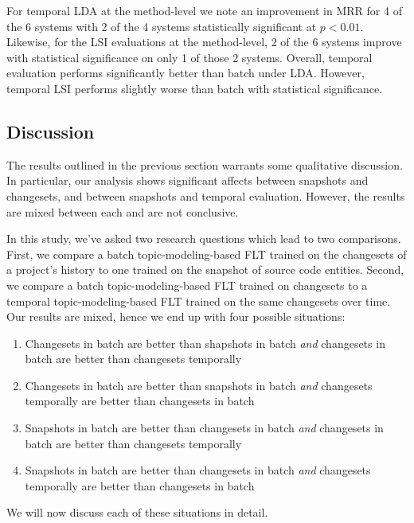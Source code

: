 For temporal LDA at the method-level we note an improvement in MRR for 4 of the 6 systems
with 2 of the 4 systems statistically significant at $p<0.01$.
Likewise, for the LSI evaluations at the method-level, 2 of the 6 systems improve
with statistical significance on only 1 of those 2 systems.
Overall, temporal evaluation performs significantly better than batch under LDA.
However, temporal LSI performs slightly worse than batch with statistical significance.



\subsection{Discussion}

The results outlined in the previous section warrants some qualitative discussion.
In particular, our analysis shows significant affects between
snapshots and changesets, and between snapshots and temporal evaluation.
However, the results are mixed between each and are not conclusive.

In this study, we've asked two research questions which lead to two comparisons.
First, we compare a batch topic-modeling-based FLT trained on the changesets
of a project's history to one trained on the snapshot of source code entities.
Second, we compare a batch topic-modeling-based FLT trained on changesets
to a temporal topic-modeling-based FLT trained on the same changesets over time.
Our results are mixed, hence we end up with four possible situations:

\begin{enumerate}
    \item Changesets in batch are better than shapshots in batch \emph{and}
        changesets in batch are better than changesets temporally
    \item Changesets in batch are better than snapshots in batch \emph{and}
        changesets temporally are better than changesets in batch
    \item Snapshots in batch are better than changesets in batch \emph{and}
        changesets in batch are better than changesets temporally
    \item Snapshots in batch are better than changesets in batch \emph{and}
        changesets temporally are better than changesets in batch
\end{enumerate}

We will now discuss each of these situations in detail.


